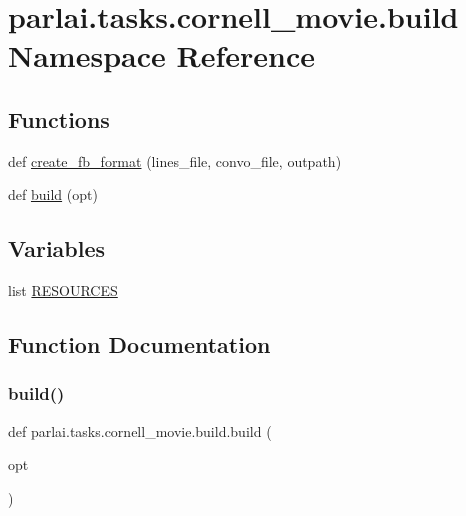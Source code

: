 \hypertarget{namespaceparlai_1_1tasks_1_1cornell__movie_1_1build}{}\section{parlai.\+tasks.\+cornell\+\_\+movie.\+build Namespace Reference}
\label{namespaceparlai_1_1tasks_1_1cornell__movie_1_1build}
\subsection*{Functions}
\begin{DoxyCompactItemize}
\item 
def \hyperlink{namespaceparlai_1_1tasks_1_1cornell__movie_1_1build_ad02efe0879bce0da293ba177112e1af3}{create\+\_\+fb\+\_\+format} (lines\+\_\+file, convo\+\_\+file, outpath)
\item 
def \hyperlink{namespaceparlai_1_1tasks_1_1cornell__movie_1_1build_aced5c0daa1d9fa613eb87535e22f1b47}{build} (opt)
\end{DoxyCompactItemize}
\subsection*{Variables}
\begin{DoxyCompactItemize}
\item 
list \hyperlink{namespaceparlai_1_1tasks_1_1cornell__movie_1_1build_a3ebe7bd780f6364ef3d5a12e120738cb}{R\+E\+S\+O\+U\+R\+C\+ES}
\end{DoxyCompactItemize}


\subsection{Function Documentation}
\mbox{\label{namespaceparlai_1_1tasks_1_1cornell__movie_1_1build_aced5c0daa1d9fa613eb87535e22f1b47}} 
\subsubsection{\texorpdfstring{build()}{build()}}
{\footnotesize\ttfamily def parlai.\+tasks.\+cornell\+\_\+movie.\+build.\+build (\begin{DoxyParamCaption}\item[{}]{opt }\end{DoxyParamCaption})}



